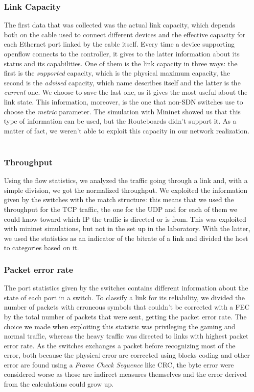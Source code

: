 \documentclass[article,10pt]{IEEEtran}
\begin{document}
\subsubsection{Link Capacity}

	The first data that was collected was the actual link capacity, which depends both on the cable used to connect
	different devices and the effective capacity for each Ethernet port linked by the cable itself. Every time a device supporting
	openflow connects to the controller, it gives to the latter information about its status and its capabilities. One of them is
	the link capacity in three ways: the first is the \textit{supported} capacity, which is the physical maximum capacity, the second is the
	\textit{advised} capacity, which name describes itself and the latter is the \textit{current} one. We choose to save the last one,
	as it gives the most useful about the link state. This information, moreover, is the one that non-SDN switches use to choose the \textit{metric}
	parameter. The simulation with Mininet showed us that this type of information can be used, but the Routeboards didn't support it.
	As a matter of fact, we weren't able to exploit this capacity in our network realization.
		\\
		\\
  \subsubsection{Throughput}

	Using the flow statistics, we analyzed the traffic going through a link and, with a simple division, we got the normalized throughput.
	We exploited the information given by the switches with the match structure: this means that we used the throughput for the TCP traffic,
	the one for the UDP and for each of them we could know toward which IP the traffic is directed or is from. This was exploited with mininet
	simulations, but not in the set up in the laboratory. With the latter, we used the statistics as an indicator of the bitrate of a link
	and divided the host to categories based on it.
\\
\subsubsection{Packet error rate}
The port statistics given by the switches contains different information about the state of each port in a switch. To classify a link for its
reliability, we divided the number of packets with erroneous symbols that couldn't be corrected with a FEC by the total number of packets that were sent,
getting the packet error rate. The choice we made when exploiting this statistic was privileging the gaming and normal traffic, whereas the
heavy traffic was directed to links with highest packet error rate.  As the switches exchanges a packet before recognizing most of the error, both because the
physical error are corrected using blocks coding and other error are found using a \textit{Frame Check Sequence} like CRC, the byte error were considered worse as
those are indirect measures themselves and the error derived from the calculations could grow up.
\end{document}
